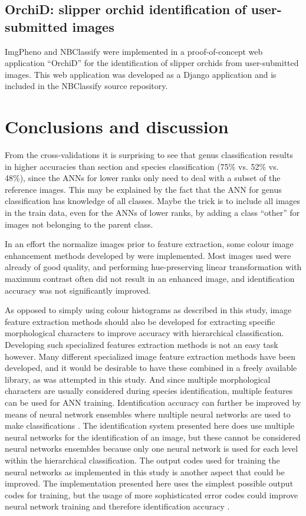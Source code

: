 \documentclass[3p,twocolumn,10pt]{elsarticle}
\begin{document}
\subsection{OrchiD: slipper orchid identification of user-submitted images}

ImgPheno and NBClassify were implemented in a proof-of-concept web application ``OrchiD'' for the identification of slipper orchids from user-submitted images. This web application was developed as a Django application and is included in the NBClassify source repository.

\section{Conclusions and discussion}
\label{sec:conclusion}

From the cross-validations it is surprising to see that genus classification results in higher accuracies than section and species classification (75\% vs. 52\% vs. 48\%), since the ANNs for lower ranks only need to deal with a subset of the reference images. This may be explained by the fact that the ANN for genus classification has knowledge of all classes. Maybe the trick is to include all images in the train data, even for the ANNs of lower ranks, by adding a class ``other'' for images not belonging to the parent class.

In an effort the normalize images prior to feature extraction, some colour image enhancement methods developed by \citet{Naik2003} were implemented. Most images used were already of good quality, and performing hue-preserving linear transformation with maximum contrast often did not result in an enhanced image, and identification accuracy was not significantly improved.

As opposed to simply using colour histograms as described in this study, image feature extraction methods should also be developed for extracting specific morphological characters to improve accuracy with hierarchical classification. Developing such specialized features extraction methods is not an easy task however. Many different specialized image feature extraction methods have been developed, and it would be desirable to have these combined in a freely available library, as was attempted in this study. And since multiple morphological characters are usually considered during species identification, multiple features can be used for ANN training. Identification accuracy can further be improved by means of neural network ensembles where multiple neural networks are used to make classifications \citep{Hansen1990}. The identification system presented here does use multiple neural networks for the identification of an image, but these cannot be considered neural networks ensembles because only one neural network is used for each level within the hierarchical classification. The output codes used for training the neural networks as implemented in this study is another aspect that could be improved. The implementation presented here uses the simplest possible output codes for training, but the usage of more sophisticated error codes could improve neural network training and therefore identification accuracy \citep{Dietterich1995}.
\end{document}
